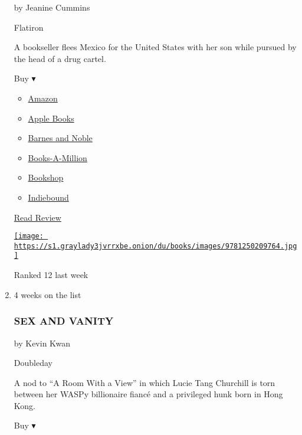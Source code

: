 \begin{enumerate}
  by Jeanine Cummins

  Flatiron

  A bookseller flees Mexico for the United States with her son while
  pursued by the head of a drug cartel.

  Buy ▾

  \begin{itemize}
  \tightlist
  \item
    \href{https://www.amazon.com/American-Dirt-Oprahs-Book-Club/dp/1250209765?tag=NYTBS-20}{Amazon}
  \item
    \href{https://du-gae-books-dot-nyt-du-prd.appspot.com/buy?title=AMERICAN+DIRT\&author=Jeanine+Cummins}{Apple
    Books}
  \item
    \href{https://www.anrdoezrs.net/click-7990613-11819508?url=https\%3A\%2F\%2Fwww.barnesandnoble.com\%2Fw\%2F\%3Fean\%3D9781250209764}{Barnes
    and Noble}
  \item
    \href{https://www.anrdoezrs.net/click-7990613-35140?url=https\%3A\%2F\%2Fwww.booksamillion.com\%2Fp\%2FAMERICAN\%2BDIRT\%2FJeanine\%2BCummins\%2F9781250209764}{Books-A-Million}
  \item
    \href{https://bookshop.org/a/3546/9781250209764}{Bookshop}
  \item
    \href{https://www.indiebound.org/book/9781250209764?aff=NYT}{Indiebound}
  \end{itemize}

  \href{https://www.nytimes3xbfgragh.onion/2020/01/17/books/review-american-dirt-jeanine-cummins.html}{Read
  Review}

  \href{https://www.nytimes3xbfgragh.onion/2020/01/17/books/review-american-dirt-jeanine-cummins.html}{\texttt{[image: https://s1.graylady3jvrrxbe.onion/du/books/images/9781250209764.jpg]}}

  Ranked 12 last week
\item
  4 weeks on the list

  \hypertarget{sex-and-vanity}{%
  \subsubsection{SEX AND VANITY}\label{sex-and-vanity}}

  by Kevin Kwan

  Doubleday

  A nod to ``A Room With a View'' in which Lucie Tang Churchill is torn
  between her WASPy billionaire fiancé and a privileged hunk born in
  Hong Kong.

  Buy ▾


\end{enumerate}
